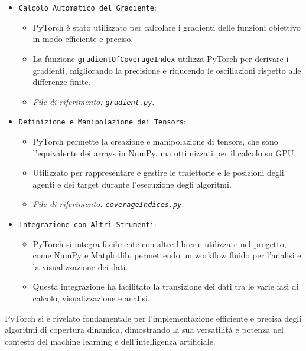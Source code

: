 \documentclass[twoside]{article}
\begin{document}
\begin{itemize}
    \item \verb|Calcolo Automatico del Gradiente|:
    \begin{itemize}
        \item PyTorch è stato utilizzato per calcolare i gradienti delle funzioni obiettivo in modo efficiente e preciso.
        \item La funzione \texttt{gradientOfCoverageIndex} utilizza PyTorch per derivare i gradienti, migliorando la precisione e riducendo le oscillazioni rispetto alle differenze finite.
        \item \textit{File di riferimento: \texttt{gradient.py}}.
    \end{itemize}
    
    \item \verb|Definizione e Manipolazione dei Tensors|:
    \begin{itemize}
        \item PyTorch permette la creazione e manipolazione di tensors, che sono l'equivalente dei arrays in NumPy, ma ottimizzati per il calcolo su GPU.
        \item Utilizzato per rappresentare e gestire le traiettorie e le posizioni degli agenti e dei target durante l'esecuzione degli algoritmi.
        \item \textit{File di riferimento: \texttt{coverageIndices.py}}.
    \end{itemize}

    \vspace{\baselineskip}
    
    \item \verb|Integrazione con Altri Strumenti|:
    \begin{itemize}
        \item PyTorch si integra facilmente con altre librerie utilizzate nel progetto, come NumPy e Matplotlib, permettendo un workflow fluido per l'analisi e la visualizzazione dei dati.
        \item Questa integrazione ha facilitato la transizione dei dati tra le varie fasi di calcolo, visualizzazione e analisi.
    \end{itemize}
\end{itemize}


PyTorch si è rivelato fondamentale per l'implementazione efficiente e precisa degli algoritmi di copertura dinamica, dimostrando la sua versatilità e potenza nel contesto del machine learning e dell'intelligenza artificiale.
\end{document}
